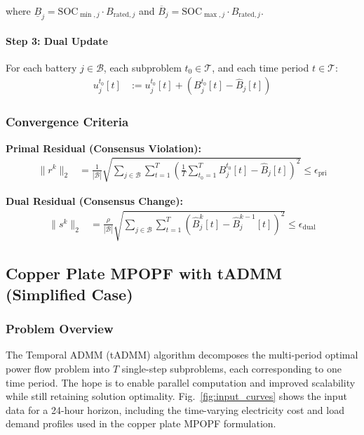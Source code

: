 where $\underline{B}_j = \text{SOC}_{\min,j} \cdot B_{\text{rated},j}$ and $\overline{B}_j = \text{SOC}_{\max,j} \cdot B_{\text{rated},j}$.

\paragraph{Step 3: Dual Update}
For each battery $j \in \mathcal{B}$, each subproblem $t_0 \in \mathcal{T}$, and each time period $t \in \mathcal{T}$:
\begin{align}
u_j^{t_0}[t] &:= u_j^{t_0}[t] + \left( B_j^{t_0}[t] - \hat{B}_j[t] \right)
\end{align}

\subsubsection{Convergence Criteria}

\textbf{Primal Residual (Consensus Violation):}
\begin{align}
\|r^k\|_2 &= \frac{1}{|\mathcal{B}|} \sqrt{\sum_{j \in \mathcal{B}} \sum_{t=1}^T \left( \frac{1}{T} \sum_{t_0=1}^T B_j^{t_0}[t] - \hat{B}_j[t] \right)^2} \leq \epsilon_{\text{pri}}
\end{align}

\textbf{Dual Residual (Consensus Change):}
\begin{align}
\|s^k\|_2 &= \frac{\rho}{|\mathcal{B}|} \sqrt{\sum_{j \in \mathcal{B}} \sum_{t=1}^T \left( \hat{B}_j^k[t] - \hat{B}_j^{k-1}[t] \right)^2} \leq \epsilon_{\text{dual}}
\end{align}

\subsection{Copper Plate MPOPF with tADMM (Simplified Case)}

\subsubsection{Problem Overview}

The Temporal ADMM (tADMM) algorithm decomposes the multi-period optimal power flow problem into $T$ single-step subproblems, each corresponding to one time period. The hope is to enable parallel computation and improved scalability while still retaining solution optimality. Fig.~\ref{fig:input_curves} shows the input data for a 24-hour horizon, including the time-varying electricity cost and load demand profiles used in the copper plate MPOPF formulation.

